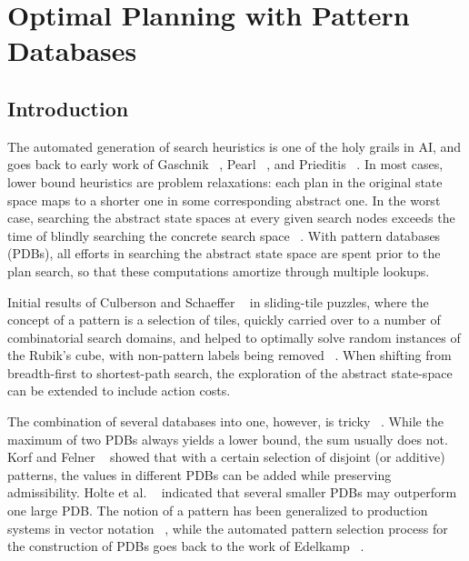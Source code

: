 \chapter{Optimal Planning with Pattern Databases}

\ifpdf
    \graphicspath{{Chapter3/Figs/Raster/}{Chapter3/Figs/PDF/}{Chapter3/Figs/}}
\else
    \graphicspath{{Chapter3/Figs/Vector/}{Chapter3/Figs/}}
\fi

\section{Introduction}

The automated generation of search heuristics is one of the holy grails in AI, and goes back to early work of Gaschnik ~\cite{Gaschnik:79}, Pearl ~\cite{Pearl:heuristics}, and Prieditis ~\cite{Preditis:Discovery}. In most cases, lower bound heuristics are problem relaxations: each plan in the original state space maps to a shorter one in some corresponding abstract one. In the worst case, searching the abstract state spaces at every given search nodes exceeds the time of blindly searching the concrete search space ~\cite{Valtorta:84}. With pattern databases (PDBs), all efforts in searching the abstract state space are spent prior to the plan search, so that these computations amortize through multiple lookups. 

Initial results of Culberson and Schaeffer ~\cite{Culberson:pdb-first} in sliding-tile puzzles, where the concept of a pattern is a selection of tiles, quickly carried over to a number of combinatorial search domains, and helped to optimally solve random instances of the Rubik's cube, with non-pattern labels being removed ~\cite{Korf:Rubik}. When shifting from breadth-first to shortest-path search, the exploration of the abstract state-space can be extended to include action costs.

The combination of several databases into one, however, is tricky ~\cite{Haslum:07}. While the maximum of two PDBs always yields a lower bound, the sum usually does not. Korf and Felner ~\cite{Korf:DisjointPDB} showed that with a certain selection of disjoint (or additive) patterns, the values in different PDBs can be added while preserving admissibility. Holte et al. ~\cite{Holte:MultiplePDb} indicated that several smaller PDBs may outperform one large PDB. The notion of a pattern has been generalized to production systems in vector notation ~\cite{Holte:99}, while the automated pattern selection process for the construction of PDBs goes back to the work of Edelkamp ~\cite{Edelkamp:GA}. 


